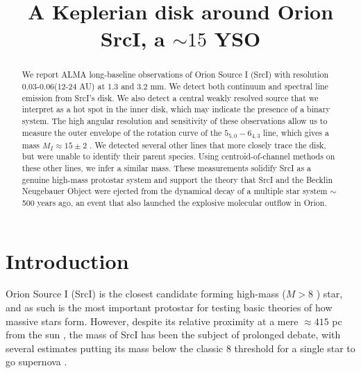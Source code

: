 \documentclass[twocolumn]{aastex62}
\newcommand{\sourcei}{SrcI\xspace}
\begin{document}


\title{A Keplerian disk around Orion \sourcei, a $\sim15$ \msun YSO}
\begin{abstract}
   We report ALMA long-baseline observations of Orion Source I (\sourcei) with resolution
   0.03-0.06\arcsec (12-24 AU) at 1.3 and 3.2 mm.
   We detect both continuum and spectral line emission from \sourcei's disk.
   We also detect a central weakly resolved source that we interpret as a hot spot
   in the inner disk, which may indicate the presence of a binary system.
   The high angular resolution and sensitivity of these observations allow us
   to measure the outer envelope of the rotation curve of the \water
   $5_{5,0}-6_{4,3}$ line, which gives a mass $M_I\approx15\pm2$ \msun.
   We detected several other lines that more closely trace the disk, but were
   unable to identify their parent species.  Using centroid-of-channel methods
   on these other lines, we infer a similar mass.
   These measurements solidify \sourcei as a genuine high-mass protostar system
   and support the theory that \sourcei and the Becklin Neugebauer Object were
   ejected from the dynamical decay of a multiple star system $\sim$500 years
   ago, an event that also launched the explosive molecular outflow in Orion.
\end{abstract}

\section{Introduction}
Orion Source I (\sourcei) is the closest candidate forming high-mass ($M>8$ \msun) star, 
and as such is the most important protostar for testing basic theories
of how massive stars form.  However, despite its relative proximity at
a mere $\approx415$ pc from the sun \citep{Menten2007a,Kim2008a}, the mass of \sourcei
has been the subject of prolonged debate, with several estimates
putting
its mass below the classic 8 \msun threshold for a single star to go supernova
\citep[][]{Heger2003}.
\end{document}
